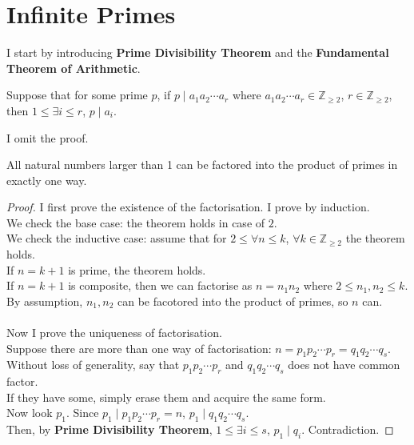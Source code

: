 \section{Infinite Primes}

I start by introducing \textbf{Prime Divisibility Theorem} and the \textbf{Fundamental Theorem of Arithmetic}.

\begin{theorem}
Suppose that for some prime $p$, if $p\mid a_{1}a_{2}\cdots a_{r}$ where $a_{1}a_{2}\cdots a_{r}\in \mathbb{Z}_{\geq 2}$, $r\in \mathbb{Z}_{\geq 2}$, then $1\leq \exists i\leq r$, $p\mid a_{i}$.
\end{theorem}

\noindent
I omit the proof.

\begin{theorem}
All natural numbers larger than 1 can be factored into the product of primes in exactly one way.
\end{theorem}

\begin{proof}
I first prove the existence of the factorisation. I prove by induction. \\
We check the base case: the theorem holds in case of $2$. \\
We check the inductive case: assume that for $2\leq \forall n\leq k$, $\forall k\in \mathbb{Z}_{\geq 2}$ the theorem holds. \\
If $n = k + 1$ is prime, the theorem holds. \\
If $n = k + 1$ is composite, then we can factorise as $n = n_{1}n_{2}$ where $2\leq n_{1}, n_{2}\leq k$. \\
By assumption, $n_{1}, n_{2}$ can be facotored into the product of primes, so $n$ can. \\
\\
Now I prove the uniqueness of factorisation. \\
Suppose there are more than one way of factorisation: $n = p_{1}p_{2}\cdots p_{r} = q_{1}q_{2}\cdots q_{s}$. \\
Without loss of generality, say that $p_{1}p_{2}\cdots p_{r}$ and $q_{1}q_{2}\cdots q_{s}$ does not have common factor. \\
If they have some, simply erase them and acquire the same form. \\
Now look $p_{1}$. Since $p_{1}\mid p_{1}p_{2}\cdots p_{r} = n$, $p_{1}\mid q_{1}q_{2}\cdots q_{s}$. \\
Then, by \textbf{Prime Divisibility Theorem}, $1\leq \exists i\leq s$, $p_{1}\mid q_{i}$. Contradiction.
\end{proof}

